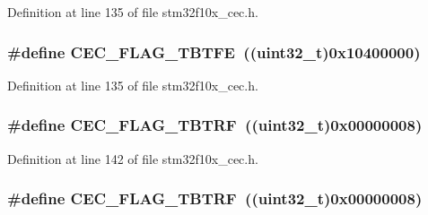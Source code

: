 Definition at line 135 of file stm32f10x\+\_\+cec.\+h.

\subsubsection[{\texorpdfstring{C\+E\+C\+\_\+\+F\+L\+A\+G\+\_\+\+T\+B\+T\+FE}{CEC_FLAG_TBTFE}}]{\setlength{\rightskip}{0pt plus 5cm}\#define C\+E\+C\+\_\+\+F\+L\+A\+G\+\_\+\+T\+B\+T\+FE~(({\bf uint32\+\_\+t})0x10400000)}\hypertarget{group___c_e_c__flags__definition_gaae90fd2f95085e113b6943bb35d899ba}{}\label{group___c_e_c__flags__definition_gaae90fd2f95085e113b6943bb35d899ba}


Definition at line 135 of file stm32f10x\+\_\+cec.\+h.

\subsubsection[{\texorpdfstring{C\+E\+C\+\_\+\+F\+L\+A\+G\+\_\+\+T\+B\+T\+RF}{CEC_FLAG_TBTRF}}]{\setlength{\rightskip}{0pt plus 5cm}\#define C\+E\+C\+\_\+\+F\+L\+A\+G\+\_\+\+T\+B\+T\+RF~(({\bf uint32\+\_\+t})0x00000008)}\hypertarget{group___c_e_c__flags__definition_gaeb02634fdd06f4ea0990e2cf23cf200e}{}\label{group___c_e_c__flags__definition_gaeb02634fdd06f4ea0990e2cf23cf200e}


Definition at line 142 of file stm32f10x\+\_\+cec.\+h.

\subsubsection[{\texorpdfstring{C\+E\+C\+\_\+\+F\+L\+A\+G\+\_\+\+T\+B\+T\+RF}{CEC_FLAG_TBTRF}}]{\setlength{\rightskip}{0pt plus 5cm}\#define C\+E\+C\+\_\+\+F\+L\+A\+G\+\_\+\+T\+B\+T\+RF~(({\bf uint32\+\_\+t})0x00000008)}\hypertarget{group___c_e_c__flags__definition_gaeb02634fdd06f4ea0990e2cf23cf200e}{}\label{group___c_e_c__flags__definition_gaeb02634fdd06f4ea0990e2cf23cf200e}


